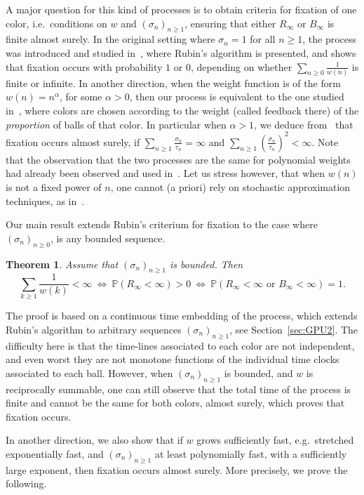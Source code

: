 \documentclass[10pt,a4paper]{amsart}
\newtheorem {theo} {Theorem} [section]
\newcommand{\1}{{\text{\Large $\mathfrak 1$}}}
\begin{document}
\vspace{0.2cm}
A major question for this kind of processes is to obtain criteria for fixation of one color, i.e.~conditions on $w$ and $(\sigma_n)_{n\ge 1}$, ensuring that either $R_\infty$ or $B_\infty$ is finite almost surely. 
In the original setting where $\sigma_n = 1$ for all $n\ge 1$, 
the process was introduced and studied in~\cite{Dav}, where Rubin's algorithm is presented, and shows that fixation occurs with probability $1$ or $0$, depending on whether 
$\sum_{n\ge 0} \frac 1{w(n)}$ is finite 
or infinite. In another direction, when the weight function is of the form $w(n) = n^\alpha$, for some $\alpha>0$, then our 
process is equivalent to the one studied in~\cite{RT24}, where colors are chosen according to the weight (called feedback there) of the {\it proportion} of balls of that color. In particular when $\alpha>1$, we deduce from~\cite{RT24} that fixation occurs almost surely, if $\sum_{n\ge 1} \frac{\sigma_n}{\tau_n} = \infty$ and 
$\sum_{n\ge 1} (\frac{\sigma_n}{\tau_n})^2 <\infty$. Note that the observation that the two processes are the same for polynomial weights had already been observed and used in~\cite{BRS}. 
Let us stress however, that when $w(n)$ is not a fixed power of $n$, one cannot (a priori) rely on stochastic approximation techniques, as in~\cite{RT24}. 

\vspace{0.2cm}
Our main result extends Rubin's criterium for fixation to the case where $(\sigma_n)_{n\ge 0}$, is any bounded sequence. 

\begin{theo} \label{thm:GPU}
Assume that $(\sigma_n)_{n\ge 1}$ is bounded. Then 
$$\sum_{k\ge 1} \frac 1{w(k)}<\infty\ \Longleftrightarrow\ \mathbb P(R_\infty <\infty) >0\ \Longleftrightarrow\ \mathbb P(R_\infty <\infty\textrm{ or }B_\infty<\infty) = 1. $$ 
\end{theo}
The proof is based on a continuous time embedding of the process, which extends Rubin's algorithm to arbitrary sequences $(\sigma_n)_{n\ge 1}$, see Section~\ref{sec:GPU2}. The difficulty here is that the time-lines associated to each color are not independent, and even worst they are not monotone functions of the individual time clocks associated to each ball. However, when $(\sigma_n)_{n\ge 1}$ is bounded, and $w$ is reciprocally summable, one can still observe that the total time of the process is finite and cannot be the same for both colors, almost surely, which proves that fixation occurs. 

\vspace{0.2cm}
In another direction, we also show that if $w$ grows sufficiently fast, e.g.~stretched exponentially fast, and $(\sigma_n)_{n\ge 1}$ at least polynomially fast, with a sufficiently large exponent, then fixation occurs almost surely. More precisely, we prove the following. 
\end{document}
